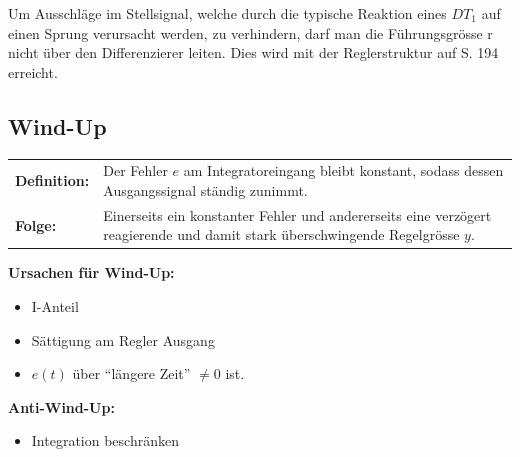   Um Ausschläge im Stellsignal, welche durch die typische Reaktion eines $DT_1$ auf einen Sprung verursacht werden, zu verhindern, darf man die Führungsgrösse r nicht über den Differenzierer leiten. Dies wird mit der Reglerstruktur auf S. 194 erreicht. 


	\subsection{Wind-Up }
  \begin{tabular}{lp{15cm}}
    \textbf{Definition:} &
    Der Fehler $e$ am Integratoreingang bleibt konstant, sodass dessen
    Ausgangssignal ständig zunimmt. \\
    
    \textbf{Folge:} & 
    Einerseits ein konstanter Fehler und andererseits eine verzögert reagierende
    und damit stark überschwingende Regelgrösse $y$.
  \end{tabular}

  \begin{multicols}{2}
    \textbf{Ursachen für Wind-Up:}
    \begin{itemize}[leftmargin=*]
      \item I-Anteil
      \item Sättigung am Regler Ausgang
      \item $e(t)$ über "`längere Zeit"' $\neq 0$ ist.
    \end{itemize}
  
  \columnbreak
    
    \textbf{Anti-Wind-Up:}
    \begin{itemize}[leftmargin=*]
      \item Integration beschränken
    \end{itemize}
  
  
  \end{multicols}
  
  

